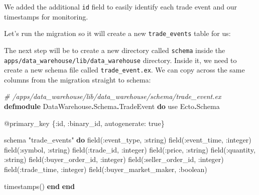 \documentclass[
]{book}
\newenvironment{Shaded}{\begin{snugshade}}{\end{snugshade}}
\newcommand{\CommentTok}[1]{\textcolor[rgb]{0.56,0.35,0.01}{\textit{#1}}}
\newcommand{\ConstantTok}[1]{\textcolor[rgb]{0.00,0.00,0.00}{#1}}
\newcommand{\ImportTok}[1]{#1}
\newcommand{\KeywordTok}[1]{\textcolor[rgb]{0.13,0.29,0.53}{\textbf{#1}}}
\newcommand{\NormalTok}[1]{#1}
\newcommand{\OperatorTok}[1]{\textcolor[rgb]{0.81,0.36,0.00}{\textbf{#1}}}
\newcommand{\OtherTok}[1]{\textcolor[rgb]{0.56,0.35,0.01}{#1}}
\newcommand{\StringTok}[1]{\textcolor[rgb]{0.31,0.60,0.02}{#1}}
\newcommand{\VariableTok}[1]{\textcolor[rgb]{0.00,0.00,0.00}{#1}}
\begin{document}
We added the additional \texttt{id} field to easily identify each trade event and our timestamps for monitoring.

Let's run the migration so it will create a new \texttt{trade\_events} table for us:

\begin{Shaded}
\end{Shaded}

The next step will be to create a new directory called \texttt{schema} inside the \texttt{apps/data\_warehouse/lib/data\_warehouse} directory. Inside it, we need to create a new schema file called \texttt{trade\_event.ex}. We can copy across the same columns from the migration straight to schema:

\begin{Shaded}
\begin{Highlighting}[]
\CommentTok{\# /apps/data\_warehouse/lib/data\_warehouse/schema/trade\_event.ex}
\KeywordTok{defmodule} \ConstantTok{DataWarehouse}\OperatorTok{.}\ConstantTok{Schema}\OperatorTok{.}\ConstantTok{TradeEvent} \KeywordTok{do}
  \ImportTok{use} \ConstantTok{Ecto}\OperatorTok{.}\ConstantTok{Schema}

  \OtherTok{@primary\_key}\NormalTok{ \{}\VariableTok{:id}\NormalTok{, }\VariableTok{:binary\_id}\NormalTok{, }\VariableTok{autogenerate:} \ConstantTok{true}\NormalTok{\}}

\NormalTok{  schema }\StringTok{"trade\_events"} \KeywordTok{do}
\NormalTok{    field(}\VariableTok{:event\_type}\NormalTok{, }\VariableTok{:string}\NormalTok{)}
\NormalTok{    field(}\VariableTok{:event\_time}\NormalTok{, }\VariableTok{:integer}\NormalTok{)}
\NormalTok{    field(}\VariableTok{:symbol}\NormalTok{, }\VariableTok{:string}\NormalTok{)}
\NormalTok{    field(}\VariableTok{:trade\_id}\NormalTok{, }\VariableTok{:integer}\NormalTok{)}
\NormalTok{    field(}\VariableTok{:price}\NormalTok{, }\VariableTok{:string}\NormalTok{)}
\NormalTok{    field(}\VariableTok{:quantity}\NormalTok{, }\VariableTok{:string}\NormalTok{)}
\NormalTok{    field(}\VariableTok{:buyer\_order\_id}\NormalTok{, }\VariableTok{:integer}\NormalTok{)}
\NormalTok{    field(}\VariableTok{:seller\_order\_id}\NormalTok{, }\VariableTok{:integer}\NormalTok{)}
\NormalTok{    field(}\VariableTok{:trade\_time}\NormalTok{, }\VariableTok{:integer}\NormalTok{)}
\NormalTok{    field(}\VariableTok{:buyer\_market\_maker}\NormalTok{, }\VariableTok{:boolean}\NormalTok{)}

\NormalTok{    timestamps()}
  \KeywordTok{end}
\KeywordTok{end}
\end{Highlighting}
\end{Shaded}
\end{document}
